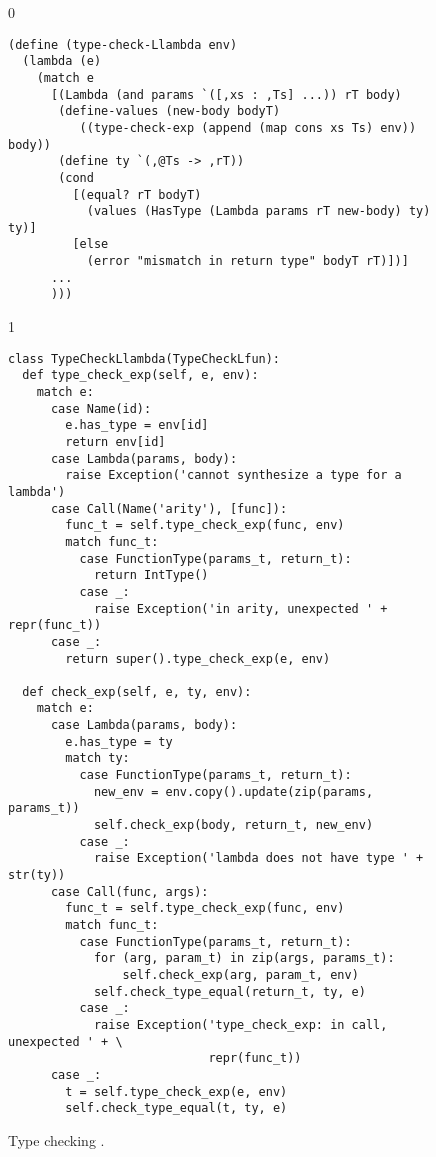 \documentclass[7x10]{TimesAPriori_MIT}%
\def\racketEd{0}
\def\pythonEd{1}
\def\edition{1}
\newcommand{\pythonColor}[0]{}
\newcommand{\python}[1]{{\if\edition\pythonEd\pythonColor #1\fi}}
\numberwithin{theorem}{chapter}
\numberwithin{definition}{chapter}
\numberwithin{equation}{chapter}
\begin{document}
\begin{figure}[tbp]
  \begin{tcolorbox}[colback=white]
    {\if\edition\racketEd 
\begin{lstlisting}
(define (type-check-Llambda env)
  (lambda (e)
    (match e
      [(Lambda (and params `([,xs : ,Ts] ...)) rT body)
       (define-values (new-body bodyT) 
          ((type-check-exp (append (map cons xs Ts) env)) body))
       (define ty `(,@Ts -> ,rT))
       (cond
         [(equal? rT bodyT)
           (values (HasType (Lambda params rT new-body) ty) ty)]
         [else
           (error "mismatch in return type" bodyT rT)])]
      ...
      )))
\end{lstlisting}
\fi}
{\if\edition\pythonEd\pythonColor 
\begin{lstlisting}
class TypeCheckLlambda(TypeCheckLfun):
  def type_check_exp(self, e, env):
    match e:
      case Name(id):
        e.has_type = env[id]
        return env[id]
      case Lambda(params, body):
        raise Exception('cannot synthesize a type for a lambda')
      case Call(Name('arity'), [func]):
        func_t = self.type_check_exp(func, env)
        match func_t:
          case FunctionType(params_t, return_t):
            return IntType()
          case _:
            raise Exception('in arity, unexpected ' + repr(func_t))
      case _:
        return super().type_check_exp(e, env)
    
  def check_exp(self, e, ty, env):
    match e:
      case Lambda(params, body):
        e.has_type = ty
        match ty:
          case FunctionType(params_t, return_t):
            new_env = env.copy().update(zip(params, params_t))
            self.check_exp(body, return_t, new_env)
          case _:
            raise Exception('lambda does not have type ' + str(ty))
      case Call(func, args):
        func_t = self.type_check_exp(func, env)
        match func_t:
          case FunctionType(params_t, return_t):
            for (arg, param_t) in zip(args, params_t):
                self.check_exp(arg, param_t, env)
            self.check_type_equal(return_t, ty, e)
          case _:
            raise Exception('type_check_exp: in call, unexpected ' + \
                            repr(func_t))
      case _:
        t = self.type_check_exp(e, env)
        self.check_type_equal(t, ty, e)
\end{lstlisting}
\fi}
  \end{tcolorbox}

  \caption{Type checking \LangLam{}\python{, part 1}.}
\label{fig:type-check-Llambda}
\end{figure}
\end{document}
